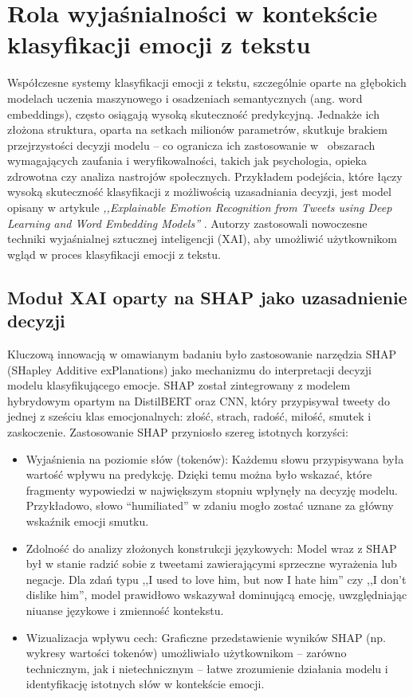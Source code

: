 \documentclass[wmii, inf, mgr]{uwmthesis}
\begin{document}
\section{Rola wyjaśnialności w kontekście klasyfikacji emocji z tekstu}
Współczesne systemy klasyfikacji emocji z tekstu, szczególnie oparte na głębokich modelach uczenia maszynowego i osadzeniach semantycznych (ang. word embeddings), często osiągają wysoką skuteczność predykcyjną. Jednakże ich złożona struktura, oparta na setkach milionów parametrów, skutkuje brakiem przejrzystości decyzji modelu -- co ogranicza ich zastosowanie w~ obszarach wymagających zaufania i weryfikowalności, takich jak psychologia, opieka zdrowotna czy analiza nastrojów społecznych. Przykładem podejścia, które łączy wysoką skuteczność klasyfikacji z możliwością uzasadniania decyzji, jest model opisany w artykule \textit{,,Explainable Emotion Recognition from Tweets using Deep Learning and Word Embedding Models''} \cite{ExplainableAI}. Autorzy zastosowali nowoczesne techniki wyjaśnialnej sztucznej inteligencji (XAI), aby umożliwić użytkownikom wgląd w proces klasyfikacji emocji z tekstu.

\subsection{Moduł XAI oparty na SHAP jako uzasadnienie decyzji}
Kluczową innowacją w omawianym badaniu było zastosowanie narzędzia SHAP (SHapley Additive exPlanations) jako mechanizmu do interpretacji decyzji modelu klasyfikującego emocje. SHAP został zintegrowany z modelem hybrydowym opartym na DistilBERT oraz CNN, który przypisywał tweety do jednej z sześciu klas emocjonalnych: złość, strach, radość, miłość, smutek i zaskoczenie. Zastosowanie SHAP przyniosło szereg istotnych korzyści:

\begin{itemize}
    \item {Wyjaśnienia na poziomie słów (tokenów)}: Każdemu słowu przypisywana była wartość wpływu na predykcję. Dzięki temu można było wskazać, które fragmenty wypowiedzi w największym stopniu wpłynęły na decyzję modelu. Przykładowo, słowo “humiliated” w zdaniu mogło zostać uznane za główny wskaźnik emocji smutku.

    \item {Zdolność do analizy złożonych konstrukcji językowych}: Model wraz z SHAP był w stanie radzić sobie z tweetami zawierającymi sprzeczne wyrażenia lub negacje. Dla zdań typu ,,I used to love him, but now I hate him'' czy ,,I don’t dislike him'', model prawidłowo wskazywał dominującą emocję, uwzględniając niuanse językowe i zmienność kontekstu.

    \item {Wizualizacja wpływu cech}: Graficzne przedstawienie wyników SHAP (np. wykresy wartości tokenów) umożliwiało użytkownikom -- zarówno technicznym, jak i nietechnicznym -- łatwe zrozumienie działania modelu i identyfikację istotnych słów w kontekście emocji.
\end{itemize}
\end{document}
